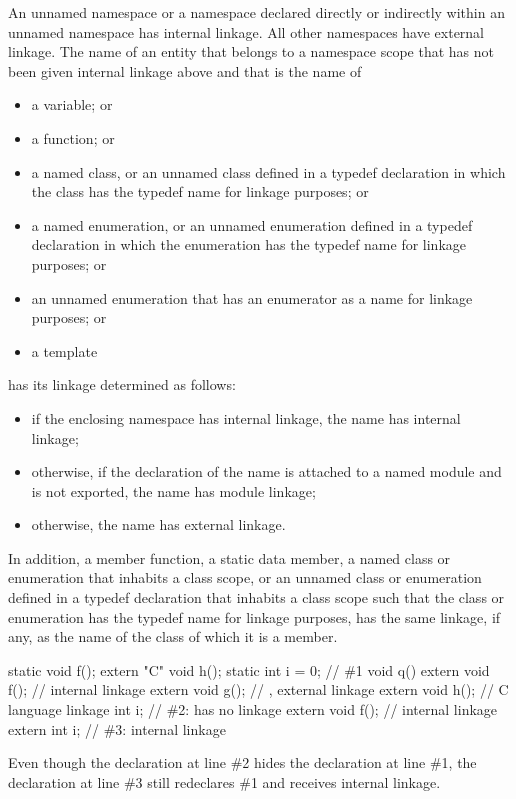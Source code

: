 \pnum
An unnamed namespace or a namespace declared directly or indirectly within an
unnamed namespace has internal linkage. All other namespaces have external linkage.
The name of an entity that belongs to a namespace scope
that has not been given internal linkage above
and that is the name of
\begin{itemize}
\item a variable; or
\item a function; or
\item
{}%
a named class, or an unnamed class defined in a
typedef declaration in which the class has the typedef name for linkage
purposes; or
\item
{}%
a named enumeration, or an unnamed enumeration defined
in a typedef declaration in which the enumeration has the typedef name
for linkage purposes; or
\item an unnamed enumeration
that has an enumerator as a name for linkage purposes; or
\item a template
\end{itemize}
has its linkage determined as follows:
\begin{itemize}
\item
if the enclosing namespace has internal linkage,
the name has internal linkage;
\item
otherwise,
if the declaration of the name is
attached to a named module
and is not exported,
the name has module linkage;
\item
otherwise,
the name has external linkage.
\end{itemize}

\pnum
In addition,
a member function,
a static data member,
a named class or enumeration that inhabits a class scope, or
an unnamed class or enumeration defined in a typedef declaration
that inhabits a class scope
such that the class or enumeration
has the typedef name for linkage purposes,
has the same linkage, if any, as the name of the class of which it is a member.

\pnum
\begin{example}
\begin{codeblock}
static void f();
extern "C" void h();
static int i = 0;               // \#1
void q() {
  extern void f();              // internal linkage
  extern void g();              // , external linkage
  extern void h();              // C language linkage
  int i;                        // \#2:  has no linkage
  {
    extern void f();            // internal linkage
    extern int i;               // \#3: internal linkage
  }
}
\end{codeblock}
Even though the declaration at line \#2 hides the declaration at line \#1,
the declaration at line \#3 still redeclares \#1 and receives internal linkage.
\end{example}

